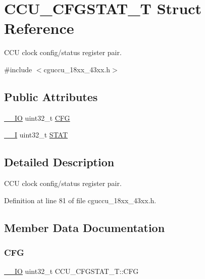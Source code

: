 \hypertarget{struct_c_c_u___c_f_g_s_t_a_t___t}{}\section{C\+C\+U\+\_\+\+C\+F\+G\+S\+T\+A\+T\+\_\+T Struct Reference}
\label{struct_c_c_u___c_f_g_s_t_a_t___t}


C\+CU clock config/status register pair.  




{\ttfamily \#include $<$cguccu\+\_\+18xx\+\_\+43xx.\+h$>$}

\subsection*{Public Attributes}
\begin{DoxyCompactItemize}
\item 
\hyperlink{core__sc300_8h_aec43007d9998a0a0e01faede4133d6be}{\+\_\+\+\_\+\+IO} uint32\+\_\+t \hyperlink{struct_c_c_u___c_f_g_s_t_a_t___t_a11260973b5e9833ce0197c5b14fdb39c}{C\+FG}
\item 
\hyperlink{core__sc300_8h_af63697ed9952cc71e1225efe205f6cd3}{\+\_\+\+\_\+I} uint32\+\_\+t \hyperlink{struct_c_c_u___c_f_g_s_t_a_t___t_a626b3e2c80c99a80389c779dfb958e45}{S\+T\+AT}
\end{DoxyCompactItemize}


\subsection{Detailed Description}
C\+CU clock config/status register pair. 

Definition at line 81 of file cguccu\+\_\+18xx\+\_\+43xx.\+h.



\subsection{Member Data Documentation}
\mbox{\label{struct_c_c_u___c_f_g_s_t_a_t___t_a11260973b5e9833ce0197c5b14fdb39c}} 
\subsubsection{\texorpdfstring{C\+FG}{CFG}}
{\footnotesize\ttfamily \hyperlink{core__sc300_8h_aec43007d9998a0a0e01faede4133d6be}{\+\_\+\+\_\+\+IO} uint32\+\_\+t C\+C\+U\+\_\+\+C\+F\+G\+S\+T\+A\+T\+\_\+\+T\+::\+C\+FG}

